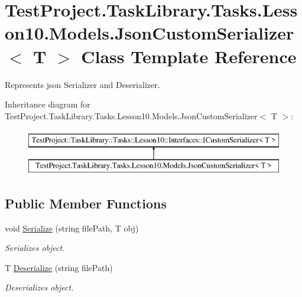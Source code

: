 \hypertarget{class_test_project_1_1_task_library_1_1_tasks_1_1_lesson10_1_1_models_1_1_json_custom_serializer}{}\section{Test\+Project.\+Task\+Library.\+Tasks.\+Lesson10.\+Models.\+Json\+Custom\+Serializer$<$ T $>$ Class Template Reference}
\label{class_test_project_1_1_task_library_1_1_tasks_1_1_lesson10_1_1_models_1_1_json_custom_serializer}


Represents json Serializer and Deserializer.  


Inheritance diagram for Test\+Project.\+Task\+Library.\+Tasks.\+Lesson10.\+Models.\+Json\+Custom\+Serializer$<$ T $>$\+:\begin{figure}[H]
\begin{center}
\leavevmode
\includegraphics[height=2.000000cm]{class_test_project_1_1_task_library_1_1_tasks_1_1_lesson10_1_1_models_1_1_json_custom_serializer}
\end{center}
\end{figure}
\subsection*{Public Member Functions}
\begin{DoxyCompactItemize}
\item 
void \mbox{\hyperlink{class_test_project_1_1_task_library_1_1_tasks_1_1_lesson10_1_1_models_1_1_json_custom_serializer_a7e32b960835ef12d7bb9d253a27244ec}{Serialize}} (string file\+Path, T obj)
\begin{DoxyCompactList}\small\item\em Serializes object. \end{DoxyCompactList}\item 
T \mbox{\hyperlink{class_test_project_1_1_task_library_1_1_tasks_1_1_lesson10_1_1_models_1_1_json_custom_serializer_ad6ab6bc444a855cc1baad8fd2c1a6b16}{Deserialize}} (string file\+Path)
\begin{DoxyCompactList}\small\item\em Deserializes object. \end{DoxyCompactList}\end{DoxyCompactItemize}


